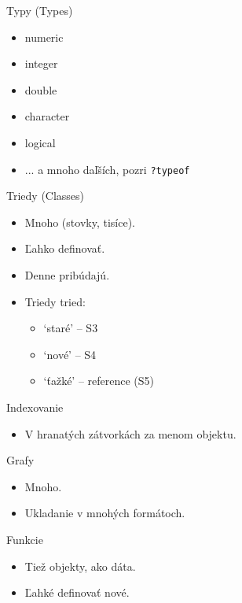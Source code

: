 \documentclass[14pt]{beamer}
\begin{document}
\begin{frame}{Typy (Types)}
	\begin{itemize}
		\item 	numeric
		\item	integer
		\item	double
		\item	character
		\item 	logical
		\item	... a mnoho da\v{l}\v{s}\'ich, pozri \texttt{?typeof}
	\end{itemize}
\end{frame}

\begin{frame}{Triedy (Classes)}
	\begin{itemize}
		\item 	Mnoho (stovky, tis\'ice).
		\item	\v{L}ahko definova\v{t}.
		\item	Denne prib\'udaj\'u.
		\item	Triedy tried:
			\begin{itemize}
				\item `star\'e' -- S3
				\item `nov\'e' -- S4
				\item `\v{t}a\v{z}k\'e' -- reference (S5)	
			\end{itemize}
	\end{itemize}
\end{frame}

\begin{frame}{Indexovanie}
	\begin{itemize}
		\item 	V hranat\'ych z\'atvork\'ach za menom objektu.
	\end{itemize}
\end{frame}

\begin{frame}{Grafy}
	\begin{itemize}
		\item 	Mnoho.
		\item	Ukladanie v mnoh\'ych form\'atoch.
	\end{itemize}
\end{frame}

\begin{frame}{Funkcie}
	\begin{itemize}
		\item 	Tie\v{z} objekty, ako d\'ata.
		\item	\v{L}ahk\'e definova\v{t} nov\'e.
	\end{itemize}
\end{frame}
\end{document}
